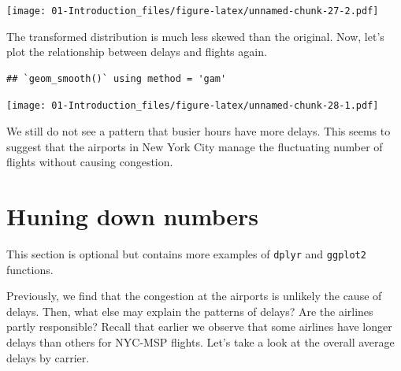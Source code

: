 \documentclass[]{book}
\newenvironment{Shaded}{\begin{snugshade}}{\end{snugshade}}
\newcommand{\KeywordTok}[1]{\textcolor[rgb]{0.13,0.29,0.53}{\textbf{{#1}}}}
\newcommand{\DataTypeTok}[1]{\textcolor[rgb]{0.13,0.29,0.53}{{#1}}}
\newcommand{\DecValTok}[1]{\textcolor[rgb]{0.00,0.00,0.81}{{#1}}}
\newcommand{\FloatTok}[1]{\textcolor[rgb]{0.00,0.00,0.81}{{#1}}}
\newcommand{\StringTok}[1]{\textcolor[rgb]{0.31,0.60,0.02}{{#1}}}
\newcommand{\CommentTok}[1]{\textcolor[rgb]{0.56,0.35,0.01}{\textit{{#1}}}}
\newcommand{\NormalTok}[1]{{#1}}
\theoremstyle{definition}
\theoremstyle{definition}
\theoremstyle{remark}
\begin{document}
\texttt{[image: 01-Introduction\_files/figure-latex/unnamed-chunk-27-2.pdf]}

The transformed distribution is much less skewed than the original. Now,
let's plot the relationship between delays and flights again.

\begin{Shaded}
\end{Shaded}

\begin{verbatim}
## `geom_smooth()` using method = 'gam'
\end{verbatim}

\texttt{[image: 01-Introduction\_files/figure-latex/unnamed-chunk-28-1.pdf]}

We still do not see a pattern that busier hours have more delays. This
seems to suggest that the airports in New York City manage the
fluctuating number of flights without causing congestion.

\section{Huning down numbers}\label{huning-down-numbers}

This section is optional but contains more examples of \texttt{dplyr}
and \texttt{ggplot2} functions.

Previously, we find that the congestion at the airports is unlikely the
cause of delays. Then, what else may explain the patterns of delays? Are
the airlines partly responsible? Recall that earlier we observe that
some airlines have longer delays than others for NYC-MSP flights. Let's
take a look at the overall average delays by carrier.
\end{document}

